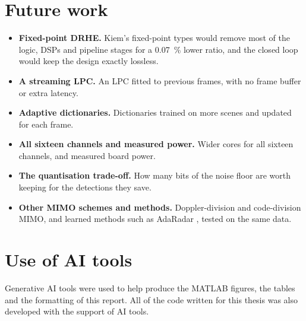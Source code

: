 \section{Future work}
\label{sec:futurework}

\begin{itemize}
\item \textbf{Fixed-point DRHE.} Kiem's fixed-point types would remove most of
the logic, DSPs and pipeline stages for a \SI{0.07}{\percent} lower ratio, and
the closed loop would keep the design exactly lossless.
\item \textbf{A streaming LPC.} An LPC fitted to previous frames, with no frame
buffer or extra latency.
\item \textbf{Adaptive dictionaries.} Dictionaries trained on more scenes and
updated for each frame.
\item \textbf{All sixteen channels and measured power.} Wider cores for all sixteen
channels, and measured board power.
\item \textbf{The quantisation trade-off.} How many bits of the noise floor are
worth keeping for the detections they save.
\item \textbf{Other MIMO schemes and methods.} Doppler-division and
code-division MIMO, and learned methods such as AdaRadar \cite{park2026}, tested
on the same data.
\end{itemize}

\section*{Use of AI tools}

Generative AI tools were used to help produce the MATLAB figures, the tables
and the formatting of this report. All of the code written for this
thesis was also developed with the support of AI tools.
